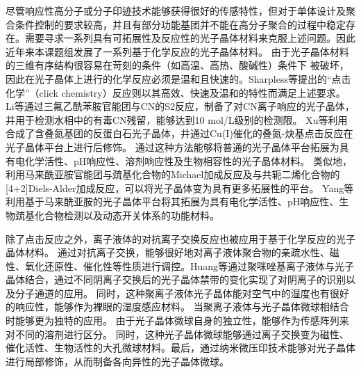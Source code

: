 尽管响应性高分子或分子印迹技术能够获得很好的传感特性，但对于单体设计及聚合条件控制的要求较高，并且有部分功能基团并不能在高分子聚合的过程中稳定存在。需要寻求一系列具有可拓展性及反应性的光子晶体材料来克服上述问题。因此近年来本课题组发展了一系列基于化学反应的光子晶体材料。
由于光子晶体材料的三维有序结构很容易在苛刻的条件（如高温、高热、酸碱性）条件下
被破坏，因此在光子晶体上进行的化学反应必须是温和且快速的。Sharpless等提出的“点击化学”（click chemistry）反应\cite{Kolb2001Click}则以其高效、快速及温和的特性而满足上述要求。
Li等通过三氟乙酰苯胺官能团与CN\text{$^-$}的S2反应，制备了对CN\text{$^-$}离子响应的光子晶体，并用于检测水相中的有毒CN\text{$^-$}残留，能够达到10 mol/L级别的检测限\cite{Li2012Reactive}。
Xu等利用合成了含叠氮基团的反蛋白石光子晶体，并通过Cu(I)催化的叠氮-炔基点击反应在光子晶体平台上进行后修饰\cite{Xu2012Clickable}。
通过这种方法能够将普通的光子晶体平台拓展为具有电化学活性、pH响应性、溶剂响应性及生物相容性的光子晶体材料。
类似地，利用马来酰亚胺官能团与巯基化合物的Michael加成反应及与共轭二烯化合物的[4+2]Diels-Alder加成反应，可以将光子晶体变为具有更多拓展性的平台。
Yang等利用基于马来酰亚胺的光子晶体平台将其拓展为具有电化学活性、pH响应性、生物巯基化合物检测以及动态开关体系的功能材料\cite{Yang2013MaleimideContaining}。

除了点击反应之外，离子液体的对抗离子交换反应也被应用于基于化学反应的光子晶体材料。
通过对抗离子交换，能够很好地对离子液体聚合物的亲疏水性、磁性、氧化还原性、催化性等性质进行调控。Huang等通过聚咪唑基离子液体与光子晶体结合，通过不同阴离子交换后的光子晶体禁带的变化实现了对阴离子的识别以及分子通道的应用\cite{Huang20103DOrdered}。
同时，这种聚离子液体光子晶体能对空气中的湿度也有很好的响应性，能够作为裸眼的湿度感应材料\cite{Huang2010Visual}。
当聚离子液体与光子晶体微球相结合时能够更为独特的应用\cite{Cui2014Inverse}。
由于光子晶体微球自身的独立性，能够作为传感阵列来对不同的溶剂进行区分。
同时，这种光子晶体微球能够通过离子交换变为磁性、催化活性、生物活性的大孔微球材料。最后，通过纳米微压印技术能够对光子晶体进行局部修饰，从而制备各向异性的光子晶体微球。

